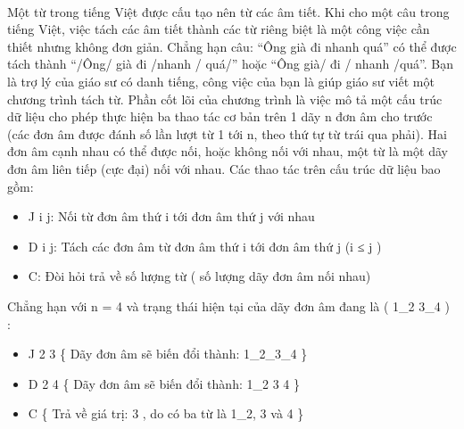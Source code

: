  

Một từ trong tiếng Việt được cấu tạo nên từ các âm tiết. Khi cho một câu trong tiếng Việt, việc tách các âm tiết thành các từ riêng biệt là một công việc cần thiết nhưng không đơn giản. Chẳng hạn câu: “Ông già đi nhanh quá” có thể được tách thành “/Ông/ già đi /nhanh / quá/” hoặc “Ông già/ đi / nhanh /quá”. Bạn là trợ lý của giáo sư có danh tiếng, công việc của bạn là giúp giáo sư viết một chương trình tách từ. Phần cốt lõi của chương trình là việc mô tả một cấu trúc dữ liệu cho phép thực hiện ba thao tác cơ bản trên 1 dãy n đơn âm cho trước (các đơn âm được đánh số lần lượt từ 1 tới n, theo thứ tự từ trái qua phải). Hai đơn âm cạnh nhau có thể được nối, hoặc không nối với nhau, một từ là một dãy đơn âm liên tiếp (cực đại) nối với nhau. Các thao tác trên cấu trúc dữ liệu bao gồm:
\begin{itemize}
	\item J i j: Nối từ đơn âm thứ i tới đơn âm thứ j với nhau
	\item D i j: Tách các đơn âm từ đơn âm thứ i tới đơn âm thứ j (i ≤ j )
	\item C: Đòi hỏi trả về số lượng từ ( số lượng dãy đơn âm nối nhau)
\end{itemize}

Chẳng hạn với n = 4 và trạng thái hiện tại của dãy đơn âm đang là ( 1\_2 3\_4 ) :
\begin{itemize}
	\item J 2 3 \{ Dãy đơn âm sẽ biến đổi thành: 1\_2\_3\_4 \}
	\item D 2 4 \{ Dãy đơn âm sẽ biến đổi thành: 1\_2 3 4 \}
	\item C \{ Trả về giá trị: 3 , do có ba từ là 1\_2, 3 và 4 \}
\end{itemize}